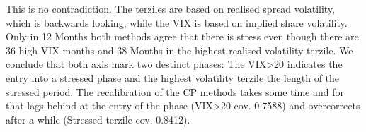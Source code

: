 %
This is no contradiction. The terziles are based on realised spread volatility, which is backwards looking, while the VIX is based on implied share volatility. Only in 12 Months both methods agree that there is stress even though there are 36 high VIX months and 38 Months in the highest realised volatility terzile. We conclude that both axis mark two destinct phases: The VIX>20 indicates the entry into a stressed phase and the highest volatility terzile the length of the stressed period. The recalibration of the CP methods takes some time and for that lags behind at the entry of the phase (VIX>20 cov. 0.7588) and overcorrects after a while (Stressed terzile cov. 0.8412). \\
